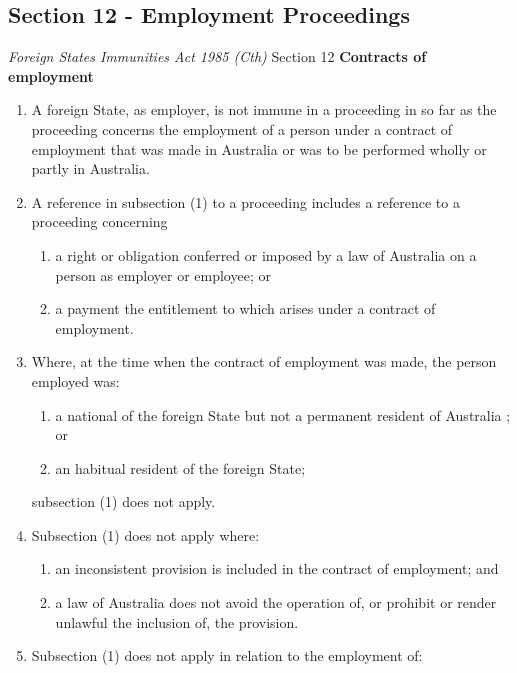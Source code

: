 \subsection{Section 12 - Employment Proceedings}
\begin{statutedetails}{\textit{Foreign States Immunities Act 1985 (Cth)} Section 12}
    \flushleft
    \textbf{Contracts of employment}

    \begin{enumerate}[label=(\arabic*)]
        \item A foreign State, as employer, is not immune in a proceeding in so far as the proceeding concerns the employment of a person under a contract of employment that was made in Australia or was to be performed wholly or partly in Australia.
        \item A reference in subsection (1) to a proceeding includes a reference to a proceeding concerning
        \begin{enumerate}[label=(\alph*)]
            \item a right or obligation conferred or imposed by a law of Australia on a person as employer or employee; or
            \item a payment the entitlement to which arises under a contract of employment.
        \end{enumerate}
        \item Where, at the time when the contract of employment was made, the person employed was:
        \begin{enumerate}[label=(\alph*)]
            \item a national of the foreign State but not a permanent resident of Australia ; or
            \item an habitual resident of the foreign State;
        \end{enumerate}
        subsection (1) does not apply.
        \item Subsection (1) does not apply where:
        \begin{enumerate}[label=(\alph*)]
            \item an inconsistent provision is included in the contract of employment; and
            \item a law of Australia does not avoid the operation of, or prohibit or render unlawful the inclusion of, the provision.
        \end{enumerate}
        \item Subsection (1) does not apply in relation to the employment of:

\end{enumerate}
\end{statutedetails}

